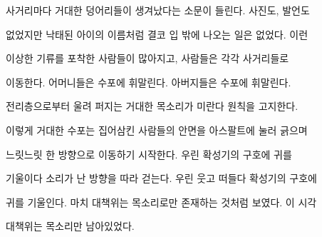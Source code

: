 사거리마다 거대한 덩어리들이 생겨났다는 소문이 들린다. 사진도, 발언도

없었지만 낙태된 아이의 이름처럼 결코 입 밖에 나오는 일은 없었다. 이런

이상한 기류를 포착한 사람들이 많아지고, 사람들은 각각 사거리들로

이동한다. 어머니들은 수포에 휘말린다. 아버지들은 수포에 휘말린다.

전리층으로부터 울려 퍼지는 거대한 목소리가 미란다 원칙을 고지한다.

이렇게 거대한 수포는 집어삼킨 사람들의 안면을 아스팔트에 눌러 긁으며

느릿느릿 한 방향으로 이동하기 시작한다. 우린 확성기의 구호에 귀를

기울이다 소리가 난 방향을 따라 걷는다. 우린 웃고 떠들다 확성기의 구호에

귀를 기울인다. 마치 대책위는 목소리로만 존재하는 것처럼 보였다. 이 시각

대책위는 목소리만 남아있었다.

